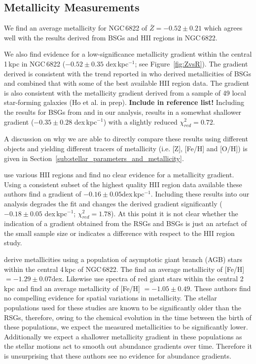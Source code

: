 \documentclass[iop]{emulateapj}
\def\2{\footnotesize II\normalsize}
\begin{document}
\subsection{Metallicity Measurements} %
\label{sub:metallicity_measurements}

We find an average metallicity for NGC\,6822 of $\bar{Z}=-0.52\pm 0.21$
which agrees well with the results derived from BSGs
\citep{1999A&A...352L..40M,2001ApJ...547..765V,Przybilla02} and H\2 regions
\citep{2006ApJ...642..813L} in NGC\,6822.

We also find evidence for a low-significance metallicity gradient within the central 1\,kpc in NGC\,6822
($-0.52\pm0.35$ dex\,kpc$^{-1}$; see Figure~\ref{fig:ZvsR}).
The gradient derived is consistent with the trend reported in
\cite{2001ApJ...547..765V} who derived metallicities of BSGs and combined that with some of the best available H\2 region data.
The gradient is also consistent with the metallicity gradient derived from a sample of 49 local star-forming galaxies (Ho et al. in prep). 
\textbf{Include in reference list!}
Including the results for BSGs from
\cite{2001ApJ...547..765V} and
\cite{1999A&A...352L..40M} in our analysis,
results in a somewhat shallower gradient
($-0.35\pm 0.28$ dex\,kpc$^{-1}$)
with a slightly reduced 
$\chi^{2}_{red}=0.72$.

A discussion on why we are able to directly compare these results using different objects and yielding different tracers of metallicity (i.e. [Z], [Fe/H] and [O/H]) is given in
Section~\ref{sub:stellar_parameters_and_metallicity}.

\cite{2006ApJ...642..813L} use various H\2
regions and find no clear evidence for a metallicity gradient.
Using a consistent subset of the highest quality H\2
region data available these authors find a gradient of
$-0.16\pm0.05$dex\,kpc$^{-1}$.
Including these results into our analysis degrades the fit and changes the derived gradient significantly
($-0.18\pm0.05$ dex\,kpc$^{-1}$; $\chi^{2}_{red}=1.78$).
At this point it is not clear whether the indication of a gradient obtained from the RSGs and BSGs is just an artefact of the small sample size or indicates a difference with respect to the
H\2 region study.

\cite{2012A&A...540A.135S} derive metallicities using a population of asymptotic giant branch (AGB) stars within the central 4\,kpc of NGC\,6822.
The find an average metallicity of [Fe/H] $=-1.29\pm0.07$dex.
Likewise
\cite{2013ApJ...779..102K}
use spectra of red giant stars within the central 2\,kpc and find an average metallicity of
[Fe/H] $=-1.05\pm0.49$.
These authors find no compelling evidence for spatial variations in metallicity.
The stellar populations used for these studies are known to be significantly older than the RSGs,
therefore, owing to the chemical evolution in the time between the birth of these populations, we expect the measured metallicities to be significantly lower.
Additionally we expect a shallower metallicity gradient in these populations as the stellar motions act to smooth out abundance gradients over time.
Therefore it is unsurprising that these authors see no evidence for abundance gradients.
\end{document}
